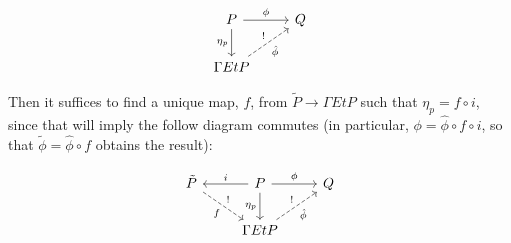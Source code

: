\[
\begin{tikzcd}
P \arrow[r,"\phi"] \arrow[d, "\eta_p"']
& Q \\
\Gamma EtP \arrow[ru, "!", "\hat{\phi}"', dashed]
\end{tikzcd}
\]

Then it suffices to find a unique map, $f$, from $\tilde{P} \rightarrow \Gamma Et P$ such that $\eta_p = f \circ i$, since that will imply the follow diagram commutes (in particular, $\phi = \hat{\phi} \circ f \circ i$, so that $\tilde{\phi} = \hat{\phi} \circ f$ obtains the result):

\[
\begin{tikzcd}
\tilde{P} \arrow[rd, "!", "f"', dashed] 
& P \arrow[l, "i"'] \arrow[r,"\phi"] \arrow[d, "\eta_p"']
& Q \\
& \Gamma EtP \arrow[ru, "!", "\hat{\phi}"', dashed]
\end{tikzcd}
\]

